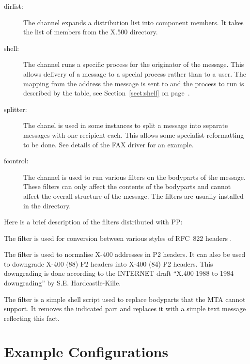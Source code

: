 \begin{description}
\item[dirlist:]
The  channel expands a distribution list into component
members. It takes the list of members from the X.500 directory.

\item[shell:]
The  channel runs a specific process for the originator of
the message. This allows delivery of a message to a special process
rather than to a user.  The mapping from the address the message is
sent to and the process to run is described by the  table,
see Section~\ref{sect:shell} on page~\pageref{sect:shell}.

\item[splitter:]
The  chanel is used in some instances to split a message
into separate messages with one recipient each. This allows some
specialist reformatting to be done. See details of the FAX driver for
an example.

\item[fcontrol:]
The  channel is used to run various filters on the
bodyparts of the message.
These filters can only affect the contents of the bodyparts and cannot
affect the overall structure of the message.
The filters are usually installed in the  directory.
\end{description}

Here is a brief description of the filters distributed with PP:
\begin{describe}
\item[\verb+rfc822norm+:] The filter is used for conversion between various
styles of RFC~822 headers
.
\item[\verb+p2norm+:] The filter is used to normalise X-400 addresses
in P2 headers. It can also be used to downgrade X-400 (88) P2
headers into X-400 (84) P2 headers. This downgrading is done according
to the INTERNET draft ``X.400 1988 to 1984 downgrading'' by S.E.
Hardcastle-Kille.

\item[\verb+removebp+:] The filter is a simple shell script used to
replace bodyparts that the MTA cannot support. It removes the
indicated part and replaces it with a simple text message reflecting
this fact.
\end{describe}

\section {Example Configurations}\label{sect:example_configs}

